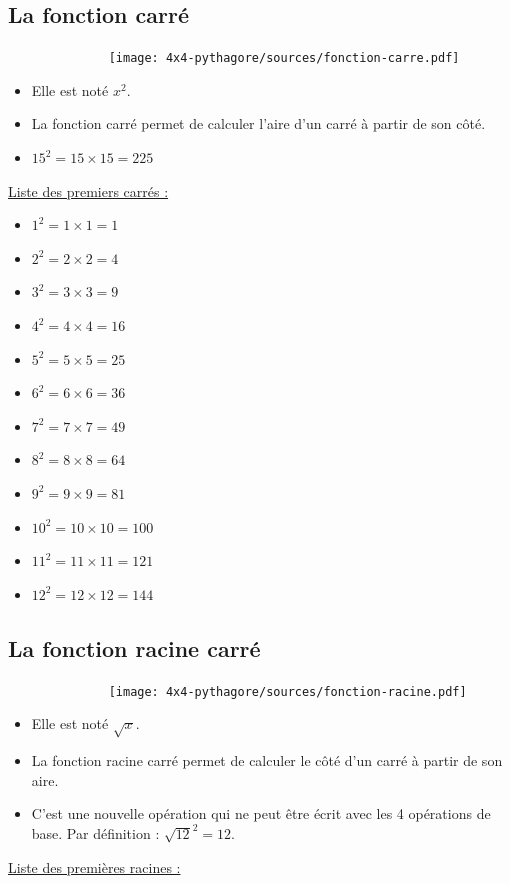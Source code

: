 \documentclass[12pt]{article}
\begin{document}
\begin{multicols}{2}

\subsection*{La fonction carré}

  \begin{figure}[H]
        \centering
        \texttt{[image: 4x4-pythagore/sources/fonction-carre.pdf]}
  \end{figure}

\begin{itemize}
\item Elle est noté $x^2$. 
\item La fonction carré permet de calculer l'aire d'un carré à partir de son côté.
\item $15^2 = 15 \times 15 = 225$
\end{itemize}
\underline{Liste des premiers carrés :}

	\begin{itemize}
		\item $1^2 = 1 \times 1 = 1$
		\item $2^2 = 2 \times 2 = 4$
		\item $3^2 = 3 \times 3 = 9$
		\item $4^2 = 4 \times 4 = 16$
		\item $5^2 = 5 \times 5 = 25$
		\item $6^2 = 6 \times 6 = 36$
		\item $7^2 = 7 \times 7 = 49$
		\item $8^2 = 8 \times 8 = 64$
		\item $9^2 = 9 \times 9 = 81$
		\item $10^2 = 10 \times 10 = 100$
		\item $11^2 = 11 \times 11 = 121$
		\item $12^2 = 12 \times 12 = 144$
	\end{itemize}

\subsection*{La fonction racine carré}

  \begin{figure}[H]
        \centering
        \texttt{[image: 4x4-pythagore/sources/fonction-racine.pdf]}
  \end{figure}

\begin{itemize}
\item Elle est noté $\sqrt{x}$. 
\item La fonction racine carré permet de calculer le côté d'un carré à partir de son aire.
\item C'est une nouvelle opération qui ne peut être écrit avec les 4 opérations de base. Par définition : $\sqrt{12}^2 = 12$.
\end{itemize}
	\underline{Liste des premières racines : }


\end{multicols}
\end{document}
